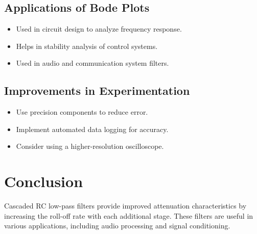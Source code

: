 \documentclass{article}
\begin{document}
\subsection{Applications of Bode Plots}
\begin{itemize}
    \item Used in circuit design to analyze frequency response.
    \item Helps in stability analysis of control systems.
    \item Used in audio and communication system filters.
\end{itemize}

\subsection{Improvements in Experimentation}
\begin{itemize}
    \item Use precision components to reduce error.
    \item Implement automated data logging for accuracy.
    \item Consider using a higher-resolution oscilloscope.
\end{itemize}
\section{Conclusion}
Cascaded RC low-pass filters provide improved attenuation characteristics by increasing the roll-off rate with each additional stage. These filters are useful in various applications, including audio processing and signal conditioning.
\end{document}
